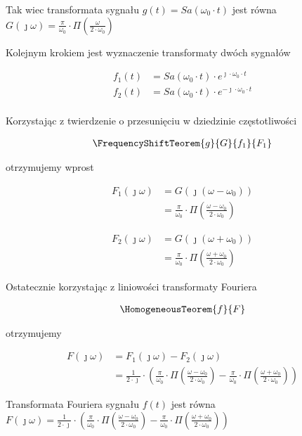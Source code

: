 \begin{task}
Tak wiec transformata sygnału $g(t)=Sa\left(\omega_0 \cdot t\right)$ jest równa $G(\jmath \omega)=\frac{\pi}{ \omega_0 } \cdot \Pi\left( \frac{\omega}{2\cdot \omega_0}\right)$

Kolejnym krokiem jest wyznaczenie transformaty dwóch sygnałów

\begin{align*}
f_1(t)&=Sa\left(\omega_0 \cdot t\right) \cdot e^{\jmath \cdot \omega_0 \cdot t}\\
f_2(t)&=Sa\left(\omega_0 \cdot t\right) \cdot e^{-\jmath \cdot \omega_0 \cdot t}\\
\end{align*}

Korzystając z twierdzenie o przesunięciu w dziedzinie częstotliwości

\begin{align*}
\FrequencyShiftTeorem{g}{G}{f_1}{F_1}
\end{align*}

otrzymujemy wprost

\begin{align*}
F_1(\jmath \omega)&=G\left(\jmath \left(\omega -\omega_0\right)\right)\\
&=\frac{\pi}{ \omega_0 } \cdot \Pi\left( \frac{\omega - \omega_0}{2\cdot \omega_0}\right)
\end{align*}

\begin{align*}
F_2(\jmath \omega)&=G\left(\jmath \left(\omega +\omega_0\right)\right)\\
&=\frac{\pi}{ \omega_0 } \cdot \Pi\left( \frac{\omega + \omega_0}{2\cdot \omega_0}\right)
\end{align*}

Ostatecznie korzystając z liniowości transformaty Fouriera

\begin{align*}
\HomogeneousTeorem{f}{F}
\end{align*}

otrzymujemy

\begin{align*}
F(\jmath \omega)&=F_1(\jmath \omega)-F_2(\jmath \omega)\\
&=\frac{1}{2 \cdot \jmath} \cdot \left( \frac{\pi}{ \omega_0 } \cdot \Pi\left( \frac{\omega - \omega_0}{2\cdot \omega_0}\right) - \frac{\pi}{ \omega_0 } \cdot \Pi\left( \frac{\omega + \omega_0}{2\cdot \omega_0}\right) \right)
\end{align*}


Transformata Fouriera sygnału $f(t)$ jest równa $F(\jmath \omega)=\frac{1}{2 \cdot \jmath} \cdot \left( \frac{\pi}{ \omega_0 } \cdot \Pi\left( \frac{\omega - \omega_0}{2\cdot \omega_0}\right) - \frac{\pi}{ \omega_0 } \cdot \Pi\left( \frac{\omega + \omega_0}{2\cdot \omega_0}\right) \right)$

\end{task}

